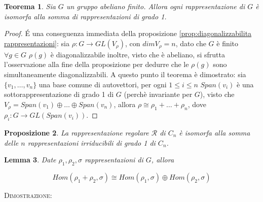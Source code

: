 \documentclass[11pt]{article}
\theoremstyle{plain}
\newtheorem{thm}{Teorema}[section]
\newtheorem{lemma}[thm]{Lemma}
\newtheorem{prop}[thm]{Proposizione}
\theoremstyle{definition}
\theoremstyle{remark}
\begin{document}
\begin{thm}Sia $G$ un gruppo abeliano finito. Allora ogni rappresentazione di $G$ è isomorfa alla somma di rappresentazioni di grado 1.
\end{thm}
\begin{proof}
	\'E una conseguenza immediata della proposizione \eqref{prop:diagonalizzabilita rappresentazioni}: sia $\rho:G\to GL(V_{\rho})$, con $dim V_{\rho} = n$, dato che $G$ è finito $\forall g\in G$ $\rho(g)$ è diagonalizzabile inoltre, visto che è abeliano, si sfrutta l'osservazione alla fine della proposizione per dedurre che le $\rho(g)$ sono simultaneamente diagonalizzabili. A questo punto il teorema è dimostrato: sia $\{v_1,\ldots,v_n\}$ una base comune di autovettori, per ogni $1\leq i\leq n$ $Span(v_i)$ è una sottorappresentazione di grado 1 di $G$ (perchè invariante per $G$), visto che $V_{\rho}=Span(v_1)\oplus\ldots\oplus Span(v_n)$, allora $\rho\cong\rho_1+\ldots+\rho_n$, dove $\rho_i:G\to GL(Span(v_i))$.
\end{proof}


\begin{prop} La rappresentazione regolare $\mathcal{R}$ di $C_n$ è isomorfa alla somma delle $n$ rappresentazioni irriducibili di grado 1 di $C_n$.

\end{prop}


\begin{lemma}
Date $\rho_1, \rho_2, \sigma$ rappresentazioni di $G$, allora

\[Hom(\rho_1 + \rho_2, \sigma) \cong Hom(\rho_1, \sigma) \oplus Hom(\rho_2, \sigma)\]

\end{lemma}

\textsc{Dimostrazione:}
\end{document}
